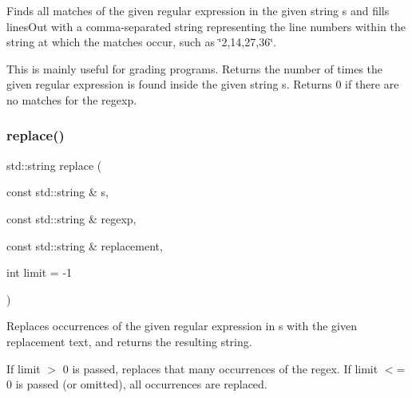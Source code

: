 Finds all matches of the given regular expression in the given string s and fills \textquotesingle{}lines\+Out\textquotesingle{} with a comma-\/separated string representing the line numbers within the string at which the matches occur, such as \char`\"{}2,14,27,36\char`\"{}. 

This is mainly useful for grading programs. Returns the number of times the given regular expression is found inside the given string s. Returns 0 if there are no matches for the regexp. \mbox{\label{namespacesgl_1_1priv_1_1regexpr_aa2ddd568cd83beb5ee37c9891eda1011}} 
\subsubsection{\texorpdfstring{replace()}{replace()}}
{\footnotesize\ttfamily std\+::string replace (\begin{DoxyParamCaption}\item[{const std\+::string \&}]{s,  }\item[{const std\+::string \&}]{regexp,  }\item[{const std\+::string \&}]{replacement,  }\item[{int}]{limit = {\ttfamily -\/1} }\end{DoxyParamCaption})}



Replaces occurrences of the given regular expression in s with the given replacement text, and returns the resulting string. 

If limit $>$ 0 is passed, replaces that many occurrences of the regex. If limit $<$= 0 is passed (or omitted), all occurrences are replaced. 
